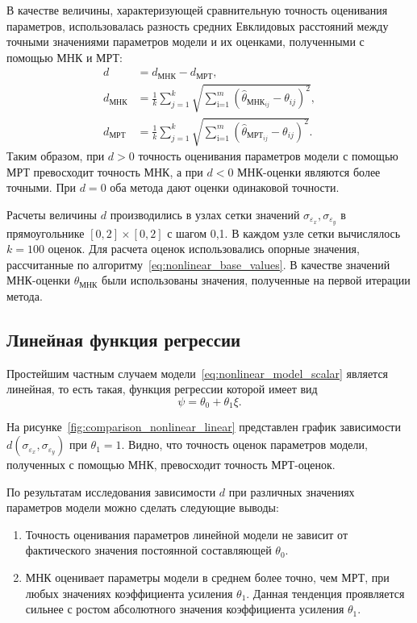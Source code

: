 В качестве величины, характеризующей сравнительную точность оценивания параметров,
использовалась разность средних Евклидовых расстояний
между точными значениями параметров модели и их оценками, полученными
с помощью МНК и МРТ:
\begin{equation}
  \begin{aligned}
    d &= d_{\text{МНК}} - d_{\text{МРТ}}, \\
    d_{\text{МНК}} &=
    \frac{1}{k} \sum_{j=1}^k
    \sqrt{\sum_{\text{i=1}}^m (\hat{\theta}_{\text{МНК}_{ij}} - \theta_{ij})^2}, \\
    d_{\text{МРТ}} &=
    \frac{1}{k} \sum_{j=1}^k
    \sqrt{\sum_{\text{i=1}}^m (\hat{\theta}_{\text{МРТ}_{ij}} - \theta_{ij})^2}.
  \end{aligned}
  \label{eq:dst_nonlinear_param}
\end{equation}
Таким образом, при \( d > 0 \) точность оценивания параметров модели с помощью МРТ
превосходит точность МНК, а при \( d < 0 \) МНК-оценки являются более точными.
При \( d = 0 \) оба метода дают оценки одинаковой точности.

Расчеты величины \( d \) производились в узлах сетки значений
\( \sigma_{\varepsilon_x}, \sigma_{\varepsilon_y} \) в прямоугольнике
\( [0, 2] \times [0, 2] \) с шагом 0{,}1.
В каждом узле сетки вычислялось \( k = 100 \) оценок.
Для расчета оценок использовались опорные значения,
рассчитанные по алгоритму~\eqref{eq:nonlinear_base_values}.
В качестве значений МНК-оценки \( \theta_{\text{МНК}} \)
были использованы значения, полученные на первой итерации метода.

\pagebreak
\subsection{Линейная функция регрессии}

Простейшим частным случаем модели~\eqref{eq:nonlinear_model_scalar} является линейная,
то есть такая, функция регрессии которой имеет вид
\[ \psi = \theta_0 + \theta_1 \xi. \]

На рисунке~\ref{fig:comparison_nonlinear_linear}
представлен график зависимости \( d(\sigma_{\varepsilon_x}, \sigma_{\varepsilon_y}) \)
при \( \theta_1 = 1 \).
Видно, что точность оценок параметров модели, полученных с помощью МНК,
превосходит точность МРТ-оценок.

По результатам исследования зависимости \( d \) при различных значениях
параметров модели можно сделать следующие выводы:
\begin{enumerate}
\item Точность оценивания параметров линейной модели не зависит
  от фактического значения постоянной составляющей \( \theta_0 \).
\item МНК оценивает параметры модели в среднем более точно, чем МРТ,
  при любых значениях коэффициента усиления \( \theta_1 \).
  Данная тенденция проявляется сильнее с ростом абсолютного значения
  коэффициента усиления \( \theta_1 \).
\end{enumerate}

